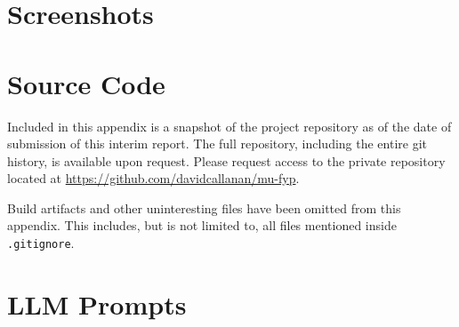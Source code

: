 \documentclass[12pt,a4paper,twoside]{report}
\begin{document}
\chapter{Screenshots}

% 

\newpage

\chapter{Source Code}

Included in this appendix is a snapshot of the project repository as of the date of submission of this interim report. The full repository, including the entire git history, is available upon request. Please request access to the private repository located at \href{https://github.com/davidcallanan/mu-fyp}{https://github.com/davidcallanan/mu-fyp}.

Build artifacts and other uninteresting files have been omitted from this appendix. This includes, but is not limited to, all files mentioned inside \lstinline{.gitignore}.

% 

\newpage

\chapter{LLM Prompts}

% 






\label{LastPage}
\end{document}
